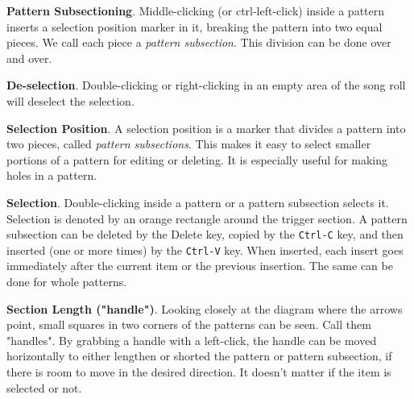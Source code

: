   \begin{enumber}
      \item \textbf{Pattern Subsectioning}.
         Middle-clicking (or ctrl-left-click)
         inside a pattern inserts a selection position
         marker in it, breaking the pattern into two equal pieces.
         We call each piece a \textsl{pattern subsection}.
         This division can be done over and over.
      \item \textbf{De-selection}.
         Double-clicking or right-clicking in an empty area of the song roll
         will deselect the selection.
      \item \textbf{Selection Position}.
         A selection position is a marker that divides a pattern into two
         pieces, called \textsl{pattern subsections}.  This makes it easy to
         select smaller portions of a pattern for editing or deleting.  It
         is especially useful for making holes in a pattern.
      \item \textbf{Selection}.
         Double-clicking inside a pattern or a pattern subsection selects it.
         Selection is denoted by an orange rectangle around the trigger
         section.
         A pattern subsection can be deleted by the
         Delete key, copied by the
         \texttt{Ctrl-C} key, and then inserted (one or more times) by the
         \texttt{Ctrl-V} key.  When inserted, each insert goes immediately
         after the current item or the previous insertion.  The same can be
         done for whole patterns.
      \item \textbf{Section Length ("handle")}.
         Looking closely at the diagram where the arrows point, small
         squares in two corners of the patterns can be seen.
         Call them "handles".
         By grabbing
         a handle with a left-click, the handle can be moved horizontally
         to either lengthen or shorted the pattern or pattern subsection, if
         there is room to move in the desired direction.
         It doesn't matter if the item is selected or not.

\end{enumber}
